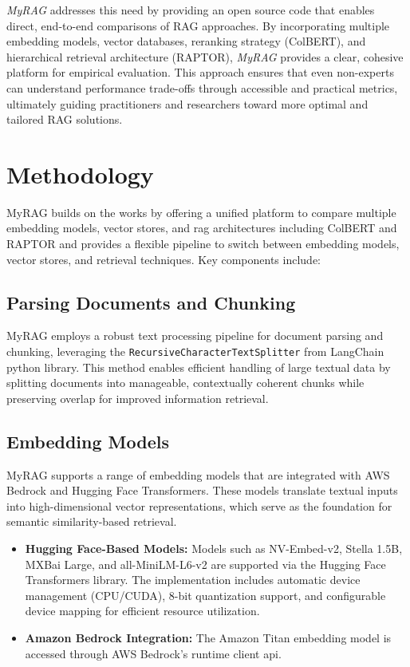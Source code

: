 \documentclass[pdflatex,sn-mathphys-num]{sn-jnl}%
\theoremstyle{thmstyleone}%
\theoremstyle{thmstyletwo}%
\theoremstyle{thmstylethree}%
\begin{document}
\textit{MyRAG} addresses this need by providing an open source code that enables direct, end-to-end comparisons of RAG approaches. By incorporating multiple embedding models, vector databases, reranking strategy (ColBERT), and hierarchical retrieval architecture (RAPTOR), \textit{MyRAG} provides a clear, cohesive platform for empirical evaluation. This approach ensures that even non-experts can understand performance trade-offs through accessible and practical metrics, ultimately guiding practitioners and researchers toward more optimal and tailored RAG solutions.

\section{Methodology}\label{sec3}
MyRAG builds on the works by offering a unified platform to compare multiple embedding models, vector stores, and rag architectures including ColBERT and RAPTOR and provides a flexible pipeline to switch between embedding models, vector stores, and retrieval techniques. Key components include:

\subsection{Parsing Documents and Chunking}\label{subsec3.1}


MyRAG employs a robust text processing pipeline for document parsing and chunking, leveraging the \texttt{RecursiveCharacterTextSplitter} from LangChain python library. This method enables efficient handling of large textual data by splitting documents into manageable, contextually coherent chunks while preserving overlap for improved information retrieval.

\subsection{Embedding Models}\label{subsec3.2}

MyRAG supports a range of embedding models that are integrated 
 with AWS Bedrock and Hugging Face Transformers. These models translate textual inputs into high-dimensional vector representations, which serve as the foundation for semantic similarity-based retrieval.

\begin{itemize}
    \item \textbf{Hugging Face-Based Models:} Models such as NV-Embed-v2, Stella 1.5B, MXBai Large, and all-MiniLM-L6-v2 are supported via the Hugging Face Transformers library. The implementation includes automatic device management (CPU/CUDA), 8-bit quantization support, and configurable device mapping for efficient resource utilization.

    \item \textbf{Amazon Bedrock Integration:} The Amazon Titan embedding model is accessed through AWS Bedrock's runtime client api. 
\end{itemize}
\end{document}
